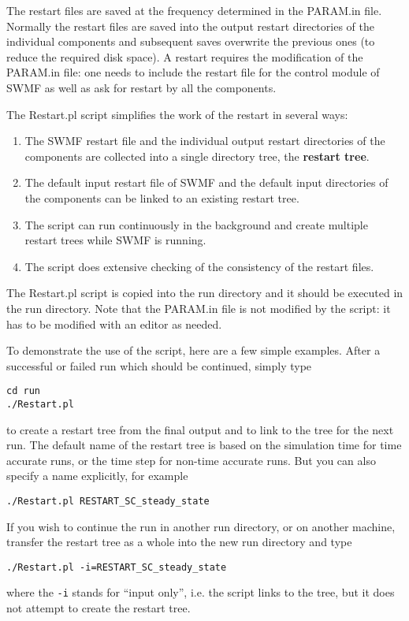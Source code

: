 The restart files are saved at the frequency determined in the PARAM.in file.
Normally the restart files are saved into the output restart directories
of the individual components and subsequent saves overwrite the previous ones
(to reduce the required disk space). A restart requires the modification
of the PARAM.in file: one needs to include the restart file for the
control module of SWMF as well as ask for restart by all the components.

The Restart.pl script simplifies the work of the restart in several ways:
\begin{enumerate}
\item The SWMF restart file and the individual output restart 
directories of the components are collected into a single directory tree, 
the {\bf restart tree}.
\item The default input restart file of SWMF and the default 
      input directories of the components can be linked to an existing
      restart tree.
\item The script can run continuously in the background and create
      multiple restart trees while SWMF is running. 
\item The script does extensive checking of the consistency 
      of the restart files.
\end{enumerate}
The Restart.pl script is copied into the run directory and it should
be executed in the run directory. Note that the PARAM.in file is not
modified by the script: it has to be modified with an editor as needed.

To demonstrate the use of the script, here are a few simple examples.
After a successful or failed run which should be continued, simply type
\begin{verbatim}
cd run
./Restart.pl
\end{verbatim}
to create a restart tree from the final output and to link to the tree for the
next run. The default name of the restart tree is based on the simulation time
for time accurate runs, or the time step for non-time accurate runs.
But you can also specify a name explicitly, for example
\begin{verbatim}
./Restart.pl RESTART_SC_steady_state
\end{verbatim}
If you wish to continue the run in another run directory, or on another
machine, transfer the restart tree as a whole into the new run
directory and type
\begin{verbatim}
./Restart.pl -i=RESTART_SC_steady_state
\end{verbatim}
where the {\tt -i} stands for ``input only'', i.e. the script links to
the tree, but it does not attempt to create the restart tree.

